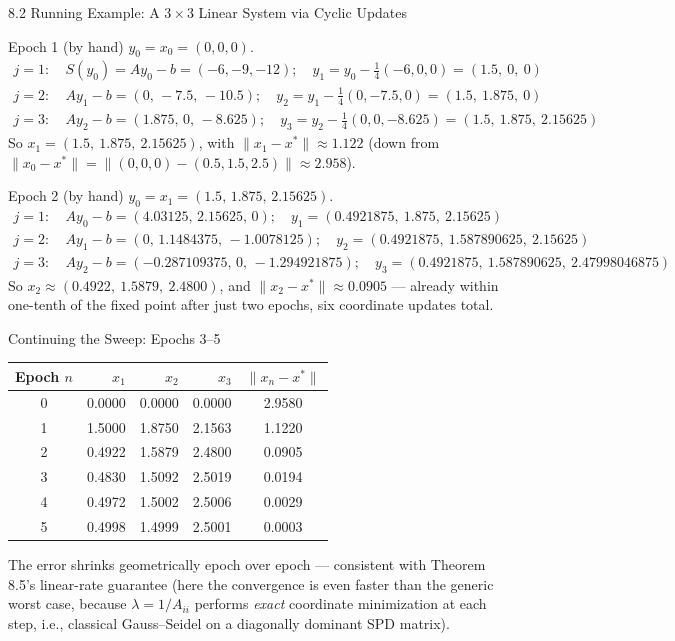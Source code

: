 \documentclass[aspectratio=169,10pt]{beamer}
\newcommand{\norm}[1]{\lVert #1 \rVert}
\begin{document}
\begin{frame}[allowframebreaks]{8.2 Running Example: A $3\times3$ Linear System via Cyclic Updates}
\begin{exampleblock}{Epoch 1 (by hand)}
$y_0=x_0=(0,0,0)$.
\begin{align*}
  j{=}1:\ & S(y_0)=Ay_0-b=(-6,-9,-12);\quad y_1 = y_0-\tfrac14(-6,0,0) = (1.5,\ 0,\ 0) \\
  j{=}2:\ & Ay_1-b = (0,\,-7.5,\,-10.5);\quad y_2 = y_1-\tfrac14(0,-7.5,0) = (1.5,\ 1.875,\ 0) \\
  j{=}3:\ & Ay_2-b = (1.875,\,0,\,-8.625);\quad y_3 = y_2-\tfrac14(0,0,-8.625) = (1.5,\ 1.875,\ 2.15625)
\end{align*}
So $x_1=(1.5,\ 1.875,\ 2.15625)$, with $\norm{x_1-x^*}\approx 1.122$ (down from $\norm{x_0-x^*}=\norm{(0,0,0)-(0.5,1.5,2.5)}\approx 2.958$).
\end{exampleblock}

\begin{exampleblock}{Epoch 2 (by hand)}
$y_0=x_1=(1.5,\,1.875,\,2.15625)$.
\begin{align*}
  j{=}1:\ & Ay_0-b=(4.03125,\,2.15625,\,0);\quad y_1=(0.4921875,\ 1.875,\ 2.15625) \\
  j{=}2:\ & Ay_1-b=(0,\,1.1484375,\,-1.0078125);\quad y_2=(0.4921875,\ 1.587890625,\ 2.15625) \\
  j{=}3:\ & Ay_2-b=(-0.287109375,\,0,\,-1.294921875);\quad y_3=(0.4921875,\ 1.587890625,\ 2.47998046875)
\end{align*}
So $x_2 \approx (0.4922,\ 1.5879,\ 2.4800)$, and $\norm{x_2-x^*}\approx 0.0905$ --- already within one-tenth of the fixed point after just two epochs, six coordinate updates total.
\end{exampleblock}

\framebreak

\begin{block}{Continuing the Sweep: Epochs 3--5}
\begin{center}
\begin{tabular}{crrrc}
\toprule
Epoch $n$ & $x_1$ & $x_2$ & $x_3$ & $\norm{x_n-x^*}$ \\
\midrule
0 & 0.0000 & 0.0000 & 0.0000 & 2.9580 \\
1 & 1.5000 & 1.8750 & 2.1563 & 1.1220 \\
2 & 0.4922 & 1.5879 & 2.4800 & 0.0905 \\
3 & 0.4830 & 1.5092 & 2.5019 & 0.0194 \\
4 & 0.4972 & 1.5002 & 2.5006 & 0.0029 \\
5 & 0.4998 & 1.4999 & 2.5001 & 0.0003 \\
\bottomrule
\end{tabular}
\end{center}
The error shrinks geometrically epoch over epoch --- consistent with Theorem 8.5's linear-rate guarantee (here the convergence is even faster than the generic worst case, because $\lambda=1/A_{ii}$ performs \emph{exact} coordinate minimization at each step, i.e., classical Gauss--Seidel on a diagonally dominant SPD matrix).
\end{block}


\end{frame}
\end{document}
